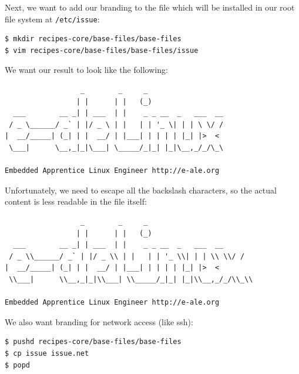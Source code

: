 \documentclass[a4paper,12pt,obeyspaces,spaces,hyphens]{article}
\begin{document}
Next, we want to add our branding to the file which will be installed in our root file system at \texttt{/etc/issue}:

\begin{verbatim}
$ mkdir recipes-core/base-files/base-files
$ vim recipes-core/base-files/base-files/issue
\end{verbatim}

We want our result to look like the following:

\begin{tcolorbox}[enhanced jigsaw,colback=bg,boxrule=0pt,arc=0pt]
\begin{verbatim}
                  _        _     _
                 | |      | |   (_)
  ___        __ _| | ___  | |    _ _ __  _   ___  __
 / _ \______/ _` | |/ _ \ | |   | | '_ \| | | \ \/ /
|  __/_____| (_| | |  __/ | |___| | | | | |_| |>  <
 \___|      \__,_|_|\___| \_____/_|_| |_|\__,_/_/\_\

Embedded Apprentice Linux Engineer http://e-ale.org
\end{verbatim}
\end{tcolorbox}

Unfortunately, we need to escape all the backslash characters, so the actual content is less readable in the file itself:

\begin{tcolorbox}[enhanced jigsaw,colback=bg,boxrule=0pt,arc=0pt]
\begin{verbatim}
                  _        _     _
                 | |      | |   (_)
  ___        __ _| | ___  | |    _ _ __  _   ___  __
 / _ \\______/ _` | |/ _ \\ | |   | | '_ \\| | | \\ \\/ /
|  __/_____| (_| | |  __/ | |___| | | | | |_| |>  <
 \\___|      \\__,_|_|\\___| \\_____/_|_| |_|\\__,_/_/\\_\\

Embedded Apprentice Linux Engineer http://e-ale.org
\end{verbatim}
\end{tcolorbox}

We also want branding for network access (like ssh):
\begin{verbatim}
$ pushd recipes-core/base-files/base-files
$ cp issue issue.net
$ popd
\end{verbatim}
\end{document}
